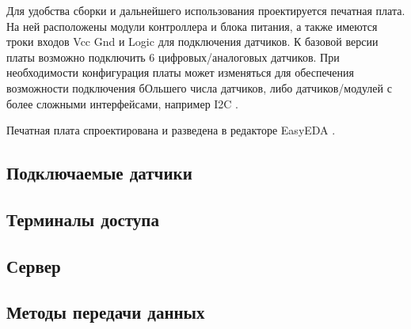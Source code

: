 Для удобства сборки и дальнейшего использования проектируется печатная плата.
На ней расположены модули контроллера и блока питания, а также имеются троки входов Vcc Gnd и Logic для подключения датчиков.
К базовой версии платы возможно подключить 6 цифровых/аналоговых датчиков.
При необходимости конфигурация платы может изменяться для обеспечения возможности подключения бОльшего числа датчиков, либо датчиков/модулей с более сложными интерфейсами, например I2C .

Печатная плата спроектирована и разведена в редакторе EasyEDA .


\subsection{Подключаемые датчики}


\subsection{Терминалы доступа}
\subsection{Сервер}
\subsection{Методы передачи данных}



\newpage{}